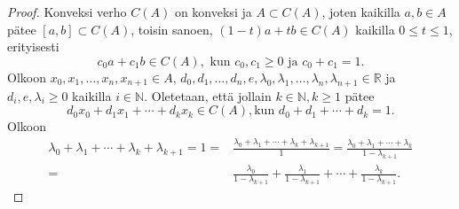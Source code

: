 \documentclass[12pt,a4paper,leqno]{report}
\newcommand{\R}{\mathbb{R}}
\newcommand{\N}{\mathbb{N}}
\theoremstyle{plain}
\theoremstyle{definition}
\theoremstyle{remark}
\begin{document}
\begin{proof}
Konveksi verho $C(A)$ on konveksi ja $A\subset C(A)$, 
joten kaikilla $a,b\in A$ pätee $[a,b]\subset C(A)$, 
toisin sanoen, $(1-t)a+tb\in C(A)$ kaikilla $0\leq t \leq 1$, 
erityisesti 
\begin{equation*}\label{konvsis}
c_0 a+c_1 b \in C(A),\text{ kun }c_0,c_1\geq 0\text{ ja }c_0 +c_1=1.
\end{equation*}
Olkoon $x_0,x_1,\dots, x_n, x_{n+1} \in A$, 
$d_0,d_1,\dots, d_n,e, \lambda_0 ,\lambda_1,\dots,\lambda_{n},\lambda_{n+1} \in \R$ 
ja $d_i,e, \lambda_{i}\geq 0$ kaikilla $ i\in\N$. 
Oletetaan, että jollain $k\in\N,k\geq 1$ pätee 
\begin{equation}\label{konvoletus}
d_0 x_0+d_1 x_1+\cdots+d_{k} x_{k}\in C(A), \text{kun } d_0+d_1+\cdots+ d_{k} =1.
 \end{equation}
%
%
%
%
%
%
%
Olkoon 
\begin{equation}\label{konvsumma}
\begin{split}
 \lambda_0+\lambda_1+\cdots+ \lambda_{k}+ \lambda_{k+1}=1=&\frac{\lambda_0+\lambda_1+\cdots+ \lambda_{k}+ \lambda_{k+1}}{1}=\frac{\lambda_0+\lambda_1+\cdots+ \lambda_{k}}{1- \lambda_{k+1}}\\
 =&\frac{ \lambda_0}{1-\lambda_{k+1}} +\frac{ \lambda_1}{1-\lambda_{k+1}} +\cdots+\frac{ \lambda_k}{1-\lambda_{k+1}} .
\end{split}

\end{equation}
\end{proof}
\end{document}
